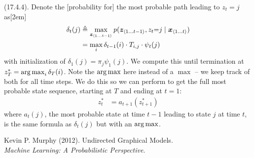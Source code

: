 \documentclass[11pt]{article}
\begin{document}
\myspace
\p {} (17.4.4). Denote the [probability for] the most probable path leading to $z_t{=}j$ as[2em]
\begin{align}
	\delta_t(j) 
		&\triangleq \max_{\slice[t-1]{z}} p(\slice[t-1]{z}, z_t{=}j \mid \slice[t]{x}) \\
		&= \max_i \delta_{t-1}(i) \cdot T_{i,j} \cdot  \psi_t(j)
\end{align}
with initialization of $\delta_1(j) = \pi_j \psi_1(j)$. We compute this until termination at $z_{T}^* = \operatorname*{arg\,max}_i \delta_T(i)$. Note the $\operatorname*{arg\,max}$ here instead of a $\max$ -- we keep track of both for all time steps. We do this so we can perform  to get the full most probable state sequence, starting at $T$ and ending at $t=1$:
\begin{align}
	z_t^* &= a_{t+1}(z_{t+1}^*)
\end{align}
where $a_t(j)$, the most probable state at time $t-1$ leading to state $j$ at time $t$, is the same formula as $\delta_t(j)$ but with an $\operatorname*{arg\,max}$. 































\vspace{-1.7em}
{\scriptsize Kevin P. Murphy (2012). Undirected Graphical Models.\\ \textit{Machine Learning: A Probabilistic Perspective}.\\ }
\end{document}
